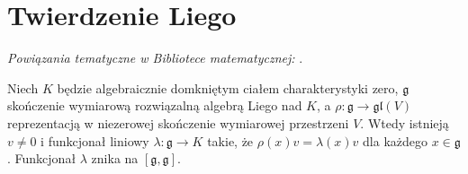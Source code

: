 \section{Twierdzenie Liego}

\noindent\emph{Powiązania tematyczne w Bibliotece matematycznej:} .


\begin{twierdzenie}
\label{aa:tw:lie-eigenvector}
Niech $K$ będzie algebraicznie domkniętym ciałem
charakterystyki zero, $\mathfrak g$ skończenie
wymiarową rozwiązalną algebrą Liego nad $K$,
a $\rho:\mathfrak g\to\mathfrak{gl}(V)$ reprezentacją
w niezerowej skończenie wymiarowej przestrzeni $V$.
Wtedy istnieją $v\ne0$ i funkcjonał liniowy
$\lambda:\mathfrak g\to K$ takie, że
$\rho(x)v=\lambda(x)v$ dla każdego $x\in\mathfrak g$.
Funkcjonał $\lambda$ znika na $[\mathfrak g,\mathfrak g]$.
\end{twierdzenie}
